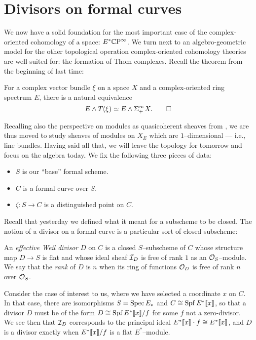 \section{Divisors on formal curves}

We now have a solid foundation for the most important case of the complex-oriented cohomology of a space: $E^* \mathbb{C}\mathrm P^\infty$.  We turn next to an algebro-geometric model for the other topological operation complex-oriented cohomology theories are well-suited for: the formation of Thom complexes.  Recall the theorem from the beginning of last time:
\begin{theorem}
For a complex vector bundle $\xi$ on a space $X$ and a complex-oriented ring spectrum $E$, there is a natural equivalence \[E \wedge T(\xi) \simeq E \wedge \Sigma^\infty_+ X. \qed\]
\end{theorem}
Recalling also the perspective on modules as quasicoherent sheaves from , we are thus moved to study sheaves of modules on $X_E$ which are $1$--dimensional --- i.e., line bundles.  Having said all that, we will leave the topology for tomorrow and focus on the algebra today.  We fix the following three pieces of data:
\begin{itemize}
\item $S$ is our ``base'' formal scheme.
\item $C$ is a formal curve over $S$.
\item $\zeta: S \to C$ is a distinguished point on $C$.
\end{itemize}

Recall that yesterday we defined what it meant for a subscheme to be closed.  The notion of a divisor on a formal curve is a particular sort of closed subscheme:

\begin{definition}
An \textit{effective Weil divisor} $D$ on $C$ is a closed $S$--subscheme of $C$ whose structure map $D \to S$ is flat and whose ideal sheaf $\mathcal{I}_D$ is free of rank $1$ as an $\mathcal{O}_S$--module.  We say that the \textit{rank} of $D$ is $n$ when its ring of functions $\mathcal{O}_D$ is free of rank $n$ over $\mathcal{O}_S$.
\end{definition}

Consider the case of interest to us, where we have selected a coordinate $x$ on $C$.  In that case, there are isomorphisms $S = \operatorname{Spec} E_*$ and $C \cong \operatorname{Spf} E^*\llbracket{x}\rrbracket$, so that a divisor $D$ must be of the form $D \cong \operatorname{Spf} E^*\llbracket{x}\rrbracket / f$ for some $f$ not a zero-divisor.  We see then that $\mathcal{I}_D$ corresponds to the principal ideal $E^*\llbracket{x}\rrbracket \cdot f \cong E^*\llbracket{x}\rrbracket$, and $D$ is a divisor exactly when $E^*\llbracket{x}\rrbracket / f$ is a flat $E^*$--module. 
 
